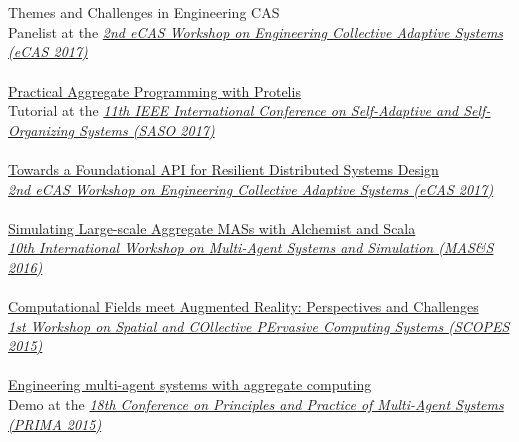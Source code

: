 \\ \halfblankline \\
Themes and Challenges in Engineering CAS \\
Panelist at the \href{http://apice.unibo.it/xwiki/bin/view/ECAS2017/WebHome}{\textit{2nd eCAS Workshop on Engineering Collective Adaptive Systems (eCAS 2017)}}
\\ \halfblankline \\
\href{https://www.slideshare.net/DanySK/practical-aggregate-programming-with-protelis-saso2017}{Practical Aggregate Programming with Protelis} \\
Tutorial at the \href{http://apice.unibo.it/xwiki/bin/view/ECAS2017/WebHome}{\textit{11th IEEE International Conference on Self-Adaptive and Self-Organizing Systems (SASO 2017)}}
\\ \halfblankline \\
\href{https://www.slideshare.net/DanySK/2nd-ecas-workshop-on-engineering-collective-adaptive-systems}{Towards a Foundational API for Resilient Distributed Systems Design} \\
\href{http://apice.unibo.it/xwiki/bin/view/ECAS2017/WebHome}{\textit{2nd eCAS Workshop on Engineering Collective Adaptive Systems (eCAS 2017)}}
\\ \halfblankline \\
\href{https://www.slideshare.net/DanySK/simulating-largescale-aggregate-mass-with-alchemist-and-scala}{Simulating Large-scale Aggregate MASs with Alchemist and Scala} \\
\href{https://fedcsis.org/2016/mass}{\textit{10th International Workshop on Multi-Agent Systems and Simulation (MAS\&S 2016)}}
\\ \halfblankline \\
\href{https://www.slideshare.net/DanySK/computational-fields-meet-augmented-reality-perspectives-and-challenges}{Computational Fields meet Augmented Reality: Perspectives and Challenges} \\
\href{http://www.spatial-computing.org/scopes}{\textit{1st Workshop on Spatial and COllective PErvasive Computing Systems (SCOPES 2015)}}
\\ \halfblankline \\
\href{http://apice.unibo.it/xwiki/bin/download/PRIMA2015/Demos/Pianini.pdf}{Engineering multi-agent systems with aggregate computing} \\
Demo at the \href{http://apice.unibo.it/xwiki/bin/view/PRIMA2015/Demos}{\textit{18th Conference on Principles and Practice of Multi-Agent Systems (PRIMA 2015)}}
